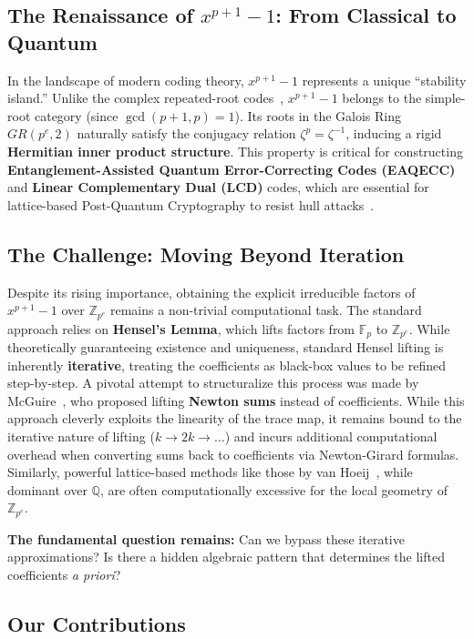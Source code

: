 \documentclass[12pt]{article}
\theoremstyle{plain}
\numberwithin{equation}{section}
\begin{document}
\subsection*{The Renaissance of $x^{p+1}-1$: From Classical to Quantum}
In the landscape of modern coding theory, $x^{p+1}-1$ represents a unique ``stability island.'' Unlike the complex repeated-root codes~\cite{Dinh2018}, $x^{p+1}-1$ belongs to the simple-root category (since $\gcd(p+1, p)=1$). Its roots in the Galois Ring $GR(p^e, 2)$ naturally satisfy the conjugacy relation $\zeta^p = \zeta^{-1}$, inducing a rigid \textbf{Hermitian inner product structure}.
This property is critical for constructing \textbf{Entanglement-Assisted Quantum Error-Correcting Codes (EAQECC)}~\cite{Sidana2022} and \textbf{Linear Complementary Dual (LCD)} codes, which are essential for lattice-based Post-Quantum Cryptography to resist hull attacks~\cite{Nishimura2025}.

\subsection*{The Challenge: Moving Beyond Iteration}
Despite its rising importance, obtaining the explicit irreducible factors of $x^{p+1}-1$ over $\mathbb{Z}_{p^e}$ remains a non-trivial computational task. 
The standard approach relies on \textbf{Hensel's Lemma}, which lifts factors from $\mathbb{F}_p$ to $\mathbb{Z}_{p^e}$. While theoretically guaranteeing existence and uniqueness, standard Hensel lifting is inherently \textbf{iterative}, treating the coefficients as black-box values to be refined step-by-step.
A pivotal attempt to structuralize this process was made by McGuire~\cite{McGuire2001}, who proposed lifting \textbf{Newton sums} instead of coefficients. While this approach cleverly exploits the linearity of the trace map, it remains bound to the iterative nature of lifting ($k \to 2k \to \dots$) and incurs additional computational overhead when converting sums back to coefficients via Newton-Girard formulas. Similarly, powerful lattice-based methods like those by van Hoeij~\cite{Hoeij2002}, while dominant over $\mathbb{Q}$, are often computationally excessive for the local geometry of $\mathbb{Z}_{p^e}$.

\textbf{The fundamental question remains:} Can we bypass these iterative approximations? Is there a hidden algebraic pattern that determines the lifted coefficients \textit{a priori}?

\subsection*{Our Contributions}
\end{document}
